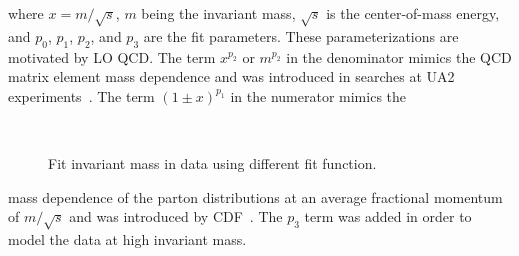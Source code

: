 where $x=m/\sqrt{s}$, $m$ being the \gamjet invariant mass, $\sqrt{s}$ is the center-of-mass energy, and $p_0$, $p_1$, $p_2$, and $p_3$ are the fit 
parameters. These parameterizations are motivated by LO QCD. The term $x^{p_{2}}$ or $m^{p_{2}}$ in the denominator mimics the  QCD matrix element 
mass dependence and was introduced in searches at UA2 experiments~\cite{Harris:2011bh}. The term $(1\pm{x})^{p_{1}}$ in the numerator mimics the
\begin{figure}[h!]
\centering
{}  \\
\caption{Fit \gamjet invariant mass in data using different fit function.}
\label{fig:DiffFitFunc}
\end{figure}
mass dependence of the parton distributions at an average fractional momentum of $m/\sqrt{s}$ and was introduced by CDF~\cite{Harris:2011bh}. 
The $p_{3}$ term was added in order to model the data at high invariant mass.


